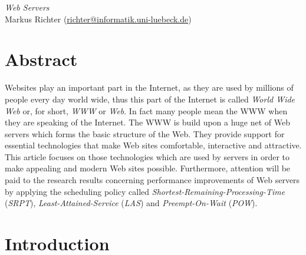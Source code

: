 \documentclass[
  a4paper,               %
  twoside,               %
  headings=small,        %
  DIV=12,                %
  BCOR=1cm,              %
  headinclude=true,      %
  footinclude=true,      %
  numbers=noenddot,      %
  11pt]{scrartcl}        %
\begin{document}
\begin{center}
\emph{\huge Web Servers} \\[1em]
Markus Richter (\url{richter@informatik.uni-luebeck.de})
\end{center}


\section*{Abstract}

Websites play an important part in the Internet, as they are used by millions of people every day world wide, thus this part of the Internet is called \emph{World Wide Web} or, for short, \emph{WWW} or \emph{Web}. In fact many people mean the WWW when they are speaking of the Internet. The WWW is build upon a huge net of Web servers which forms the basic structure of the Web. They provide support for essential technologies that make Web sites comfortable, interactive and attractive. This article focuses on those technologies which are used by servers in order to make appealing and modern Web sites possible. Furthermore, attention will be paid to the research results concerning performance improvements of Web servers by applying the scheduling policy called \emph{Shortest-Remaining-Processing-Time} (\emph{SRPT}), \emph{Least-Attained-Service}
(\emph{LAS}) and \emph{Preempt-On-Wait} (\emph{POW}).


\section{Introduction}
\end{document}
